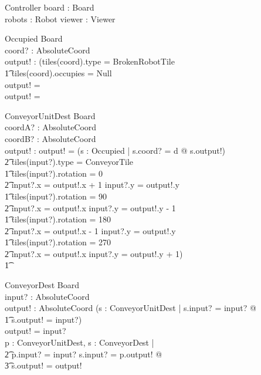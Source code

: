 \documentclass[12pt]{article}
\begin{document}
\begin{schema}{Controller}
board : Board \\
robots : \power Robot
viewer : Viewer
\end{schema}

\begin{schema}{Occupied}
\Xi Board \\
coord? : AbsoluteCoord \\
output! : \bool
\where
\IF (tiles(coord).type = BrokenRobotTile \; \; \vee \\ \t1
tiles(coord).occupies \not = Null \\
\THEN
output! = \true \\
\ELSE
output! = \false
\end{schema}

\begin{schema}{ConveyorUnitDest}
\Xi Board \\
coordA? : AbsoluteCoord \\
coordB? : AbsoluteCoord \\
output! : \bool
\where
output! = (\exists s : Occupied | s.coord? = d @ \neg s.output!) \; \; \wedge \\ \t2
        tiles(input?).type = ConveyorTile \\ \t1
        tiles(input?).rotation = 0 \Rightarrow \\ \t2 input?.x = output!.x + 1 \wedge input?.y = output!.y \\ \t1
        tiles(input?).rotation = 90 \Rightarrow \\ \t2 input?.x = output!.x \wedge input?.y = output!.y - 1 \\ \t1
        tiles(input?).rotation = 180 \Rightarrow \\ \t2 input?.x = output!.x - 1 \wedge input?.y = output!.y \\ \t1
        tiles(input?).rotation = 270 \Rightarrow \\ \t2 input?.x = output!.x \wedge input?.y = output!.y + 1) \\ \t1
\end{schema}

\begin{schema}{ConveyorDest}
\Xi Board \\
input? : AbsoluteCoord \\
output! : AbsoluteCoord
\where
\IF (\exists s : ConveyorUnitDest | s.input? = input? @ \\ \t1 s.output! = input?) \\
\THEN output! = input? \\
\ELSE \exists p : ConveyorUnitDest, s : ConveyorDest | \\ \t2 p.input? = input? \wedge s.input? = p.output! @ \\ \t3 s.output! = output!
\end{schema}
\end{document}
